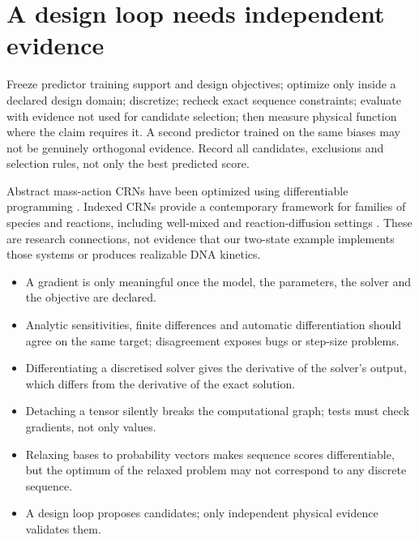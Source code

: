 \section{A design loop needs independent evidence}
Freeze predictor training support and design objectives; optimize only inside a
declared design domain; discretize; recheck exact sequence constraints; evaluate
with evidence not used for candidate selection; then measure physical function
where the claim requires it. A second predictor trained on the same biases may not
be genuinely orthogonal evidence. Record all candidates, exclusions and selection
rules, not only the best predicted score.

Abstract mass-action CRNs have been optimized using differentiable programming
\cite{Mordvintsev2023}. Indexed CRNs provide a contemporary framework for families of
species and reactions, including well-mixed and reaction-diffusion settings
\cite{Lee2025}. These are research connections, not evidence that our two-state
example implements those systems or produces realizable DNA kinetics.


\begin{KeyIdeas}
\begin{itemize}\setlength{\itemsep}{2pt}
\item A gradient is only meaningful once the model, the parameters, the solver and
the objective are declared.
\item Analytic sensitivities, finite differences and automatic differentiation
should agree on the same target; disagreement exposes bugs or step-size problems.
\item Differentiating a discretised solver gives the derivative of the solver's
output, which differs from the derivative of the exact solution.
\item Detaching a tensor silently breaks the computational graph; tests must check
gradients, not only values.
\item Relaxing bases to probability vectors makes sequence scores differentiable,
but the optimum of the relaxed problem may not correspond to any discrete
sequence.
\item A design loop proposes candidates; only independent physical evidence
validates them.
\end{itemize}
\end{KeyIdeas}

